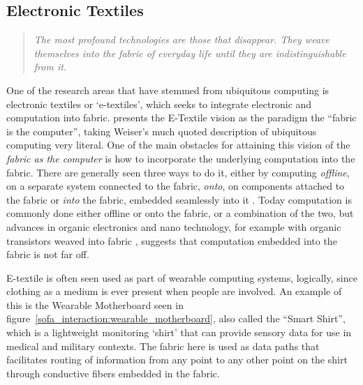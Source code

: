 \subsection{Electronic Textiles}
\label{ch:textiletouch:related:etextiles}
\begin{quotation}
\emph{The most profound technologies are those that disappear. They weave themselves into the fabric of everyday life until they are indistinguishable from it. \citep{weiser1991computer}}
\end{quotation}
One of the research areas that have stemmed from ubiquitous computing is electronic textiles or `e-textiles', which seeks to integrate electronic and computation into fabric.
\citet{park2002wearable} presents the E-Textile vision as the paradigm the ``fabric is the computer'', taking Weiser's much quoted description of ubiquitous computing very literal.
One of the main obstacles for attaining this vision of the \emph{fabric as the computer} is how to incorporate the underlying computation into the fabric.
There are generally seen three ways to do it, either by computing \emph{offline}, on a separate system connected to the fabric, \emph{onto}, on components attached to the fabric or \emph{into} the fabric, embedded seamlessly into it \citep{marculescu2003}.
Today computation is commonly done either offline or onto the fabric, or a combination of the two, but advances in organic electronics and nano technology, for example with organic transistors weaved into fabric \citep{lee2005weave}, suggests that computation embedded into the fabric is not far off.

E-textile is often seen used as part of wearable computing systems, logically, since clothing as a medium is ever present when people are involved.
An example of this is the Wearable Motherboard \citep{gopalsamy1999wearable} seen in figure~\ref{sofa_interaction:wearable_motherboard}, also called the ``Smart Shirt'', which is a lightweight monitoring `shirt' that can provide sensory data for use in medical and military contexts.
The fabric here is used as data paths that facilitates routing of information from any point to any other point on the shirt through conductive fibers embedded in the fabric.

